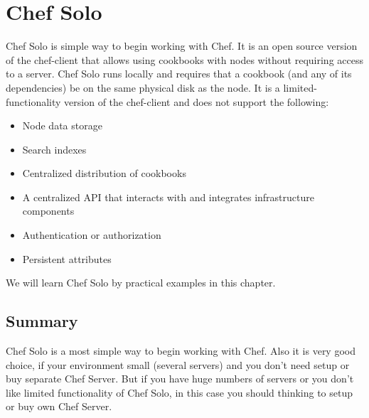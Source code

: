 \chapter{Chef Solo}

Chef Solo is simple way to begin working with Chef. It is an open source version of the chef-client that allows using cookbooks with nodes without requiring access to a server. Chef Solo runs locally and requires that a cookbook (and any of its dependencies) be on the same physical disk as the node. It is a limited-functionality version of the chef-client and does not support the following:

\begin{itemize}
  \item Node data storage
  \item Search indexes
  \item Centralized distribution of cookbooks
  \item A centralized API that interacts with and integrates infrastructure components
  \item Authentication or authorization
  \item Persistent attributes
\end{itemize}

We will learn Chef Solo by practical examples in this chapter.













\section{Summary}

Chef Solo is a most simple way to begin working with Chef. Also it is very good choice, if your environment small (several servers) and you don't need setup or buy separate Chef Server. But if you have huge numbers of servers or you don't like limited functionality of Chef Solo, in this case you should thinking to setup or buy own Chef Server.
